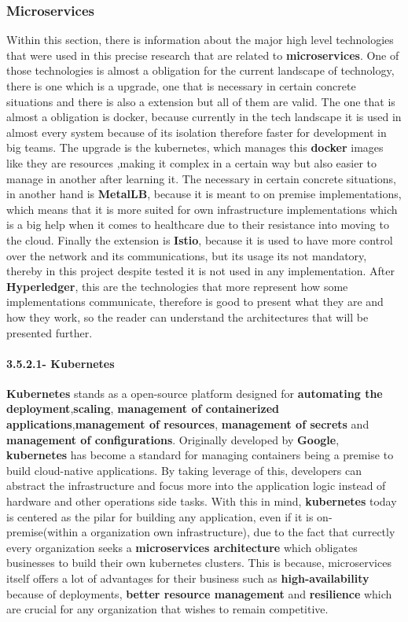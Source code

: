 \subsubsection{Microservices}
Within this section, there is information about the major high level technologies that were used in this precise research that are related to \textbf{microservices}. One of those technologies is almost a obligation for the current landscape of technology, there is one  which is a upgrade, one that is necessary in certain concrete situations and there is also a extension but all of them are valid. The one that is almost a obligation is docker, because currently in the tech landscape it is used in almost every system because of its isolation therefore faster for development in big teams. The upgrade is the kubernetes, which manages this \textbf{docker} images like they are resources ,making it complex in a certain way but also easier to manage in another after learning it. The necessary in certain concrete situations, in another hand is \textbf{MetalLB}, because it is meant to on premise implementations, which means that it is more suited for own infrastructure implementations which is a big help when it comes to healthcare due to their resistance into moving to the cloud. Finally the extension is \textbf{Istio}, because it is used to have more control over the network and its communications, but its usage its not mandatory, thereby in this project despite tested it is not used in any implementation.
After \textbf{Hyperledger}, this are the technologies that more represent how some implementations communicate, therefore is good to present what they are and how they work, so the reader can understand the architectures that will be presented further. 

\paragraph{3.5.2.1- Kubernetes}\mbox{}

\textbf{Kubernetes} stands as a open-source platform designed for \textbf{automating the deployment},\textbf{scaling}, \textbf{management of containerized applications},\textbf{management of resources}, \textbf{management of secrets} and \textbf{management of configurations}. Originally developed by \textbf{Google}, \textbf{kubernetes} has become a standard for managing containers being a premise to build cloud-native applications. By taking leverage of this, developers can abstract the infrastructure and focus more into the application logic instead of hardware and other operations side tasks. With this in mind, \textbf{kubernetes} today is centered as the pilar for building any application, even if it is on-premise(within a organization own infrastructure), due to the fact that currectly every organization seeks a \textbf{microservices architecture} which obligates businesses to build their own kubernetes clusters. This is because, microservices itself offers a lot of advantages for their business such as \textbf{high-availability} because of deployments, \textbf{better resource management} and \textbf{resilience} which are crucial for any organization that wishes to remain competitive. 

